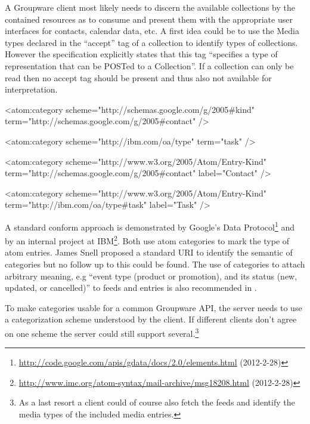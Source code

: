 \documentclass[12pt,a4paper,twoside]{scrartcl}		%
\newcommand{\citeurl}[2]{\url{#1} (#2)}
\begin{document}
A Groupware client most likely needs to discern the available collections by the
contained resources as to consume and present them with the appropriate user
interfaces for contacts, calendar data, etc. A first idea could be to use the
Media types declared in the ``accept'' tag of a collection to identify types of
collections. However the specification explicitly states that this tag
``specifies a type of representation that can be POSTed to a Collection''. If a
collection can only be read then no accept tag should be present and thus also
not available for interpretation.

\begin{anylisting}[label=fig:atom-category,
                   caption={ATOM categories as used by Google and IBM to mark entry
                            types and a proposal to use a standard scheme URI for type terms}]
<atom:category scheme="http://schemas.google.com/g/2005#kind"
               term="http://schemas.google.com/g/2005#contact" />

<atom:category scheme="http://ibm.com/oa/type"
               term="task" />

<atom:category scheme="http://www.w3.org/2005/Atom/Entry-Kind"
               term="http://schemas.google.com/g/2005#contact"
               label="Contact" />

<atom:category scheme="http://www.w3.org/2005/Atom/Entry-Kind"
               term="http://ibm.com/oa/type#task"
               label="Task" />
\end{anylisting}

A standard conform approach is demonstrated by Google's Data
Protocol\footnote{\citeurl{http://code.google.com/apis/gdata/docs/2.0/elements.html}{2012-2-28}}
and by an internal project at
IBM\footnote{\label{snellatomcategory}\citeurl{http://www.imc.org/atom-syntax/mail-archive/msg18208.html}{2012-2-28}}. Both
use atom categories\cite[sec. 8.3.6]{RFC5023} to mark the type of atom
entries. James Snell proposed a standard URI to identify the semantic of
categories but no follow up to this could be
found. The use of categories to attach arbitrary meaning, e.g ``event type
(product or promotion), and its status (new, updated, or cancelled)'' to feeds
and entries is also recommended in \cite[p. 200]{Webber2010}.

To make categories usable for a common Groupware API, the server needs to use a
categorization scheme understood by the client. If different clients don't agree
on one scheme the server could still support several.\footnote{As a last resort
  a client could of course also fetch the feeds and identify the media types of
  the included media entries.}
\end{document}
